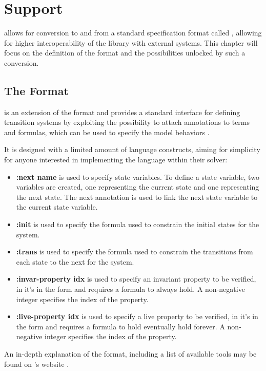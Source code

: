 \chapter{\vmtlib{} Support}
\label{ch:vmtlib}
\pyvmt{} allows for conversion to and from a standard specification format called \vmtlib{}, allowing for higher interoperability of the library with external systems.
This chapter will focus on the definition of the format and the possibilities unlocked by such a conversion.

\section{The \vmtlib{} Format}
\vmtlib{} is an extension of the \smtlib{} format and provides a standard interface for defining transition systems by exploiting the possibility to attach annotations to terms and formulas, which can be used to specify the model behaviors \cite{DBLP:journals/corr/abs-2109-12821}.

It is designed with a limited amount of language constructs, aiming for simplicity for anyone interested in implementing the language within their \vmt{} solver:
\begin{itemize}
    \item \textbf{:next name} is used to specify state variables. To define a state variable, two variables are created, one representing the current state and one representing the next state. The next annotation is used to link the next state variable to the current state variable.
    \item \textbf{:init} is used to specify the formula used to constrain the initial states for the system.
    \item \textbf{:trans} is used to specify the formula used to constrain the transitions from each state to the next for the system.
    \item \textbf{:invar-property idx} is used to specify an invariant property to be verified, in \ltl{} it's in the form \fsafe{} and requires a formula to always hold. A non-negative integer specifies the index of the property.
    \item \textbf{:live-property idx} is used to specify a live property to be verified, in \ltl{} it's in the form \flive{} and requires a formula to hold eventually hold forever. A non-negative integer specifies the index of the property.
\end{itemize}

An in-depth explanation of the format, including a list of available tools may be found on \vmtlib{}'s website \cite{VMT-LIB}.

